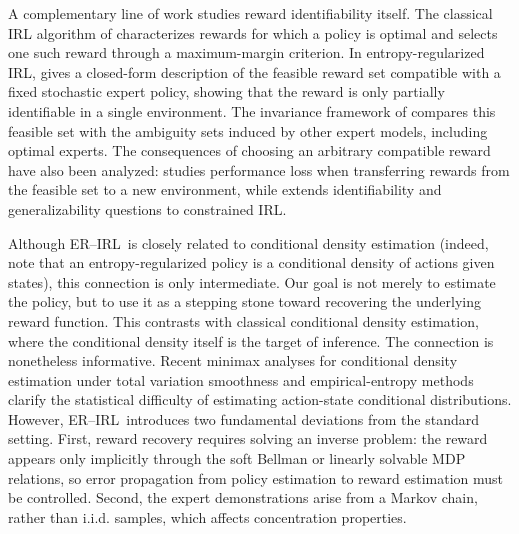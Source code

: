 \documentclass{article}
\theoremstyle{definition}
\theoremstyle{remark}
\theoremstyle{plain}
\newcommand{\ERIRL}{\textsc{ER--IRL}}
\numberwithin{equation}{section}
\begin{document}
 A complementary line of work studies reward identifiability itself. The classical IRL algorithm of \cite{ng2000algorithms} characterizes rewards for which a policy is optimal and selects one such reward through a maximum-margin criterion. In entropy-regularized IRL, \cite{cao2021identifiability} gives a closed-form description of the feasible reward set compatible with a fixed stochastic expert policy, showing that the reward is only partially identifiable in a single environment. The invariance framework of \cite{skalse2023invariance} compares this feasible set with the ambiguity sets induced by other expert models, including optimal experts. The consequences of choosing an arbitrary compatible reward have also been analyzed: \cite{schlaginhaufen2024transferability} studies performance loss when transferring rewards from the feasible set to a new environment, while \cite{schlaginhaufen2023identifiability}  extends identifiability and generalizability questions to constrained IRL.

Although \ERIRL\, is closely related to conditional density estimation (indeed, note that an entropy-regularized policy is a conditional density of actions given states), this connection is only intermediate. Our goal is not merely to estimate the policy, but to use it as a stepping stone toward recovering the underlying reward function. This contrasts with classical conditional density estimation, where the conditional density itself is the target of inference.
The connection is nonetheless informative. Recent minimax analyses for conditional density estimation under total variation smoothness \cite{LiNeykovBalakrishnan2023} and empirical-entropy methods \cite{BilodeauFosterRoy2024} clarify the statistical difficulty of estimating action-state conditional distributions. However, \ERIRL\, introduces two fundamental deviations from the standard setting. First, reward recovery requires solving an inverse problem: the reward appears only implicitly through the soft Bellman or linearly solvable MDP relations, so error propagation from policy estimation to reward estimation must be controlled. Second, the expert demonstrations arise from a  Markov chain, rather than i.i.d. samples, which affects concentration properties. 
\end{document}
